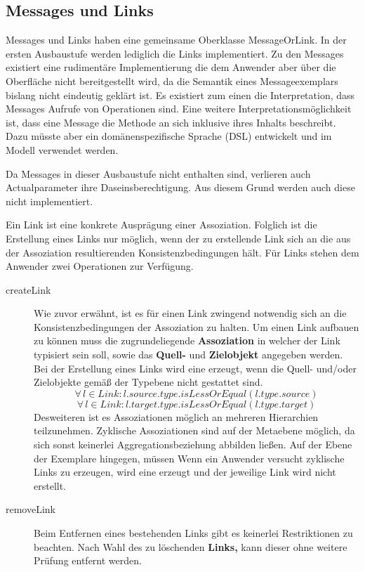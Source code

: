 \subsection{Messages und Links}\label{Message:Message}

Messages und Links haben eine gemeinsame Oberklasse MessageOrLink. In der ersten Ausbaustufe werden lediglich die Links implementiert. Zu den Messages existiert eine rudimentäre
Implementierung die dem Anwender aber über die Oberfläche nicht bereitgestellt wird, da die 
Semantik eines Messageexemplars bislang nicht eindeutig geklärt ist.
Es existiert zum einen die Interpretation, dass Messages Aufrufe von Operationen sind. Eine weitere Interpretationsmöglichkeit ist, dass eine Message die Methode an sich inklusive ihres Inhalts beschreibt. 
Dazu müsste aber ein domänenspezifische Sprache (DSL) entwickelt und im Modell verwendet werden.


Da Messages in dieser Ausbaustufe nicht enthalten sind, verlieren auch Actualparameter ihre Daseinsberechtigung. Aus diesem Grund werden auch diese nicht implementiert.

Ein Link ist eine konkrete Ausprägung einer Assoziation. Folglich ist die Erstellung eines Links nur möglich, wenn der zu erstellende Link sich an die aus der Assoziation resultierenden Konsistenzbedingungen hält. Für Links stehen dem Anwender zwei Operationen zur Verfügung.

\begin{description}
\item[createLink]
Wie zuvor erwähnt, ist es für einen Link zwingend notwendig sich an die Konsistenzbedingungen der Assoziation zu halten. Um einen Link aufbauen zu können muss die zugrundeliegende  \textbf{Assoziation} in welcher der Link typisiert sein soll, sowie das \textbf{Quell-} und \textbf{Zielobjekt} angegeben werden.
Bei der Erstellung eines Links wird eine  erzeugt, wenn die Quell- und/oder Zielobjekte gemäß der Typebene nicht 
gestattet sind.
\begin{equation} \forall \, l \in Link: l.source.type.isLessOrEqual(l.type.source)
\end{equation} 
\begin{equation} \forall \, l \in Link: l.target.type.isLessOrEqual(l.type.target)
\end{equation}
Desweiteren ist es Assoziationen möglich an mehreren Hierarchien teilzunehmen. Zyklische Assoziationen sind auf der Metaebene möglich, 
da sich sonst keinerlei Aggregationsbeziehung abbilden ließen.
Auf der Ebene der Exemplare hingegen, müssen 
Wenn ein Anwender versucht zyklische Links zu erzeugen, wird eine  erzeugt und der jeweilige Link wird nicht erstellt.
\item[removeLink]
Beim Entfernen eines bestehenden Links gibt es keinerlei Restriktionen zu beachten. Nach Wahl des zu löschenden \textbf{Links,} kann dieser ohne weitere Prüfung entfernt werden.
\end{description}